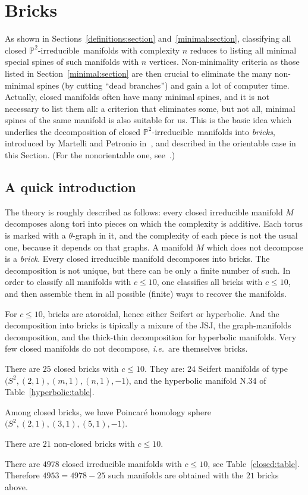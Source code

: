 \documentclass[10pt]{article}      %
\newcommand{\matP} {\ensuremath {\mathbb{P}}}
\newcommand{\ptwoirred}{$\matP^2$-irreducible}
\newcommand{\JSJ}{{\rm JSJ}}
\begin{document}
\section{Bricks} \label{bricks:section}
As shown in Sections~\ref{definitions:section} and~\ref{minimal:section}, 
classifying all closed \ptwoirred\ 
manifolds with complexity $n$ reduces to listing all minimal
special spines of such manifolds with $n$ vertices. Non-minimality criteria as
those listed in Section~\ref{minimal:section} are then crucial to eliminate
the many non-minimal spines (by cutting ``dead branches'') 
and gain a lot of computer time. Actually, closed manifolds often have many minimal spines, and it is
not necessary to list them all: a criterion that eliminates some, but not all, minimal
spines of the same manifold is also suitable for us. This is the basic idea which underlies
the decomposition of closed \ptwoirred\ manifolds into \emph{bricks}, introduced by
Martelli and Petronio in~\cite{MaPe}, and described in the orientable case in this Section.
(For the nonorientable one, see~\cite{MaPe:nonori}.)

\subsection{A quick introduction}
The theory is roughly described as follows: every closed irreducible manifold $M$
decomposes along tori into pieces on which the complexity is additive. 
Each torus is marked with a $\theta$-graph in it, and the complexity of each piece is not
the usual one, because it depends on that graphs. A manifold $M$ which does not decompose is
a \emph{brick}. Every closed irreducible manifold decomposes into bricks. 
The decomposition is not unique, but there can be only a finite number of such.
In order to classify all manifolds with $c\leqslant 10$, one classifies all
bricks with $c\leqslant 10$, and then assemble them in all possible (finite) ways
to recover the manifolds. 

For $c\leqslant 10$, bricks are atoroidal, hence either Seifert or hyperbolic.
And the decomposition into bricks is tipically 
a mixure of the \JSJ, the graph-manifolds decomposition, and 
the thick-thin decomposition for hyperbolic manifolds. 
Very few closed manifolds do not decompose,
\emph{i.e.}~are themselves bricks.

\begin{proposition}
There are $25$ closed bricks with $c\leqslant 10$. They are: $24$ Seifert manifolds
of type $\big(S^2,(2,1),(m,1),(n,1),-1\big)$, and the hyperbolic manifold N.34 of
Table~\ref{hyperbolic:table}.
\end{proposition}
Among closed bricks, we have 
Poincar\'e homology sphere $\big(S^2,(2,1),(3,1),(5,1),-1\big).$
\begin{proposition}
There are $21$ non-closed bricks with $c\leqslant 10$. 
\end{proposition}
There are $4978$ closed irreducible manifolds with $c\leqslant 10$, 
see Table~\ref{closed:table}. Therefore $4953 = 4978-25$ such manifolds
are obtained with the $21$ bricks above.
\end{document}
